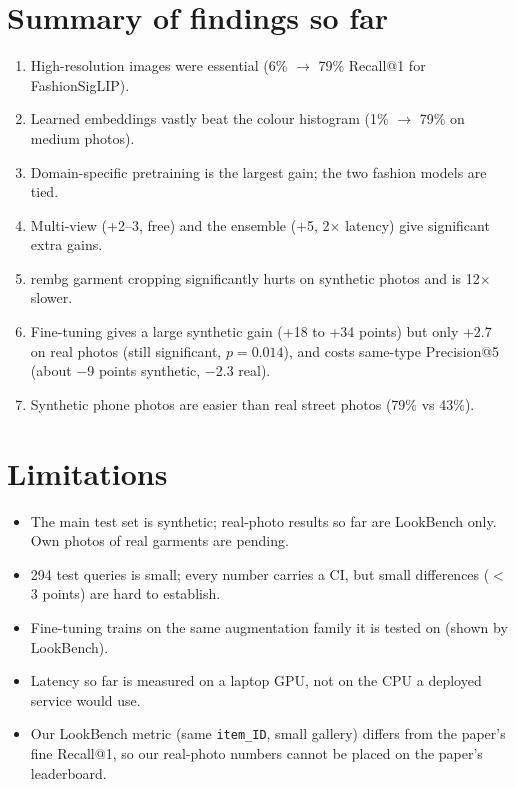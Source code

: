 \documentclass[11pt,a4paper]{article}
\begin{document}
\section{Summary of findings so far}

\begin{enumerate}
  \item High-resolution images were essential (6\% $\to$ 79\% Recall@1 for FashionSigLIP).
  \item Learned embeddings vastly beat the colour histogram (1\% $\to$ 79\% on medium photos).
  \item Domain-specific pretraining is the largest gain; the two fashion models are tied.
  \item Multi-view (+2--3, free) and the ensemble (+5, 2$\times$ latency) give significant extra gains.
  \item rembg garment cropping significantly hurts on synthetic photos and is 12$\times$ slower.
  \item Fine-tuning gives a large synthetic gain (+18 to +34 points) but only +2.7 on real photos
        (still significant, $p=0.014$), and costs same-type Precision@5 (about $-$9 points synthetic,
        $-$2.3 real).
  \item Synthetic phone photos are easier than real street photos (79\% vs 43\%).
\end{enumerate}

\section{Limitations}
\begin{itemize}
  \item The main test set is synthetic; real-photo results so far are LookBench only. Own photos of
        real garments are pending.
  \item 294 test queries is small; every number carries a CI, but small differences ($<$3 points) are
        hard to establish.
  \item Fine-tuning trains on the same augmentation family it is tested on (shown by LookBench).
  \item Latency so far is measured on a laptop GPU, not on the CPU a deployed service would use.
  \item Our LookBench metric (same \texttt{item\_ID}, small gallery) differs from the paper's fine
        Recall@1, so our real-photo numbers cannot be placed on the paper's leaderboard.
\end{itemize}
\end{document}
